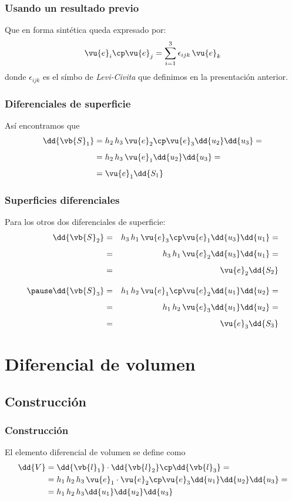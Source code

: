 \begin{frame}
\frametitle{Usando un resultado previo}
Que en forma sintética queda expresado por:
\begin{align}
\vu{e}_{i} \cp \vu{e}_{j} = \sum_{i=1}^{3} \epsilon_{ijk} \, \vu{e}_{k}
\end{align}
donde $\epsilon_{ijk}$ es el símbo de \emph{Levi-Civita} que definimos en la presentación anterior.
\end{frame}
\begin{frame}
\frametitle{Diferenciales de superficie}
Así encontramos que
\begin{align*}
\dd{\vb{S}_{1}} &= h_{2} \, h_{3} \, \vu{e}_{2} \cp \vu{e}_{3} \dd{u_{2}} \dd{u_{3}} = \\[0.5em]
&= h_{2} \, h_{3} \, \vu{e}_{1} \dd{u_{2}} \dd{u_{3}} = \\[0.5em]
&= \vu{e}_{1} \dd{S_{1}}
\end{align*}
\end{frame}
\begin{frame}
\frametitle{Superficies diferenciales}
Para los otros dos diferenciales de superficie:
\fontsize{12}{12}\selectfont
\begin{eqnarray*}
\dd{\vb{S}_{2}} &=& h_{3} \, h_{1} \, \vu{e}_{3} \cp \vu{e}_{1} \dd{u_{3}} \dd{u_{1}} = \\[0.5em]
&=& h_{3} \, h_{1} \, \vu{e}_{2} \dd{u_{3}} \dd{u_{1}} = \\[0.5em]
&=& \vu{e}_{2} \dd{S_{2}} \\[1em]
\pause
\dd{\vb{S}_{3}} &=& h_{1} \, h_{2} \, \vu{e}_{1} \cp \vu{e}_{2} \dd{u_{1}} \dd{u_{2}} = \\[0.5em]
&=& h_{1} \, h_{2} \, \vu{e}_{3} \dd{u_{1}} \dd{u_{2}} = \\[0.5em]
&=& \vu{e}_{3} \dd{S_{3}}
\end{eqnarray*}
\end{frame}
\section{Diferencial de volumen}
\subsection{Construcción}
\begin{frame}
\frametitle{Construcción}
El elemento diferencial de volumen se define como
\begin{align*}
\dd{V} &= \dd{\vb{l}_{1}} \cdot \dd{\vb{l}_{2}} \cp \dd{\vb{l}_{3}} = \\
&= h_{1} \, h_{2} \, h_{3} \, \vu{e}_{1} \cdot \vu{e}_{2} \cp \vu{e}_{3} \dd{u_{1}} \dd{u_{2}} \dd{u_{3}} = \\
&= h_{1} \, h_{2} \, h_{3} \dd{u_{1}} \dd{u_{2}} \dd{u_{3}}
\end{align*}
\end{frame}
